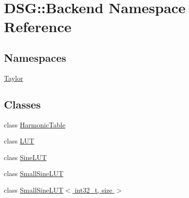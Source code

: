 \hypertarget{namespaceDSG_1_1Backend}{\section{D\+S\+G\+:\+:Backend Namespace Reference}
\label{namespaceDSG_1_1Backend}
}
\subsection*{Namespaces}
\begin{DoxyCompactItemize}
\item 
 \hyperlink{namespaceDSG_1_1Backend_1_1Taylor}{Taylor}
\end{DoxyCompactItemize}
\subsection*{Classes}
\begin{DoxyCompactItemize}
\item 
class \hyperlink{classDSG_1_1Backend_1_1HarmonicTable}{Harmonic\+Table}
\item 
class \hyperlink{classDSG_1_1Backend_1_1LUT}{L\+U\+T}
\item 
class \hyperlink{classDSG_1_1Backend_1_1SineLUT}{Sine\+L\+U\+T}
\item 
class \hyperlink{classDSG_1_1Backend_1_1SmallSineLUT}{Small\+Sine\+L\+U\+T}
\item 
class \hyperlink{classDSG_1_1Backend_1_1SmallSineLUT_3_01int32__t_00_01size_01_4}{Small\+Sine\+L\+U\+T$<$ int32\+\_\+t, size $>$}
\end{DoxyCompactItemize}
